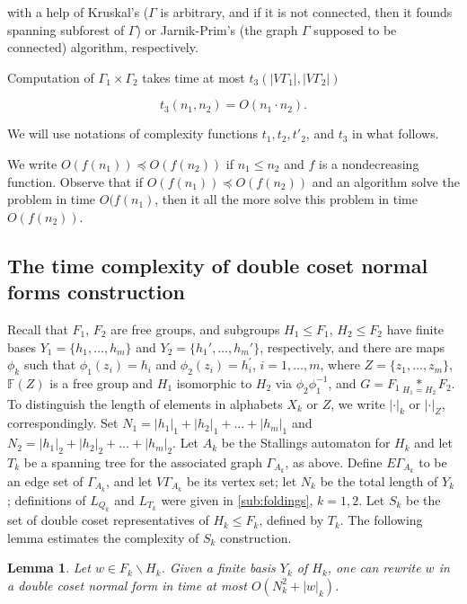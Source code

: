 \documentclass[a4paper,12pt]{article}
\newcommand{\G}{\Gamma }
\newtheorem{lemma}[theorem]{Lemma}
\numberwithin{equation}{section}
\numberwithin{figure}{section}
\newcommand{\FF}{\ensuremath{\mathbb{F}}}
\begin{document}
with a help of Kruskal's ($\G$ is arbitrary, and if it is not
connected, then it founds spanning subforest of $\G$) or
Jarnik-Prim's (the graph $\G$ supposed to be connected) algorithm,
respectively.

Computation of $\G_1 \times \G_2$ takes time at most $t_3(|V\G_1|,
|V\G_2|)$

\begin{equation}\label{t3}
t_3(n_1, n_2) = O(n_1 \cdot n_2).
\end{equation}

We will use notations of complexity functions $t_1, t_2, t'_2$,
and $t_3$ in what follows.

We write $O(f(n_1)) \preceq O(f(n_2))$ if $n_1\le n_2$ and $f$ is
a nondecreasing function. Observe that if $O(f(n_1)) \preceq
O(f(n_2))$ and an algorithm solve the problem in time $O(f(n_1)$,
then it all the more solve this problem in time $O(f(n_2))$.

\subsection{The time complexity of double coset normal forms construction}\label{sub:doubleCo_nf}

Recall that $F_1$, $F_2$ are free groups, and subgroups $H_1 \leq
F_1$, $H_2 \leq F_2$ have finite bases $Y_1 = \{h_1, \ldots, h_m
\}$ and $Y_2=\{h_1', \ldots, h_m'\}$, respectively, and there are
maps $\phi_k$ such that $\phi_1(z_i)=h_i$ and
$\phi_2(z_i)=h^\prime_i$, $i=1,\ldots ,m$, where $Z=\{z_1, \ldots,
z_m\}$, $\FF(Z)$ is a free group and $H_1$ isomorphic to $H_2$ via
$\phi_2 \phi_1^{-1}$, and ${G = F_1 \underset{H_1=H_2}{\ast}
F_2}$. To distinguish the length of elements in alphabets $X_k$ or
$Z$, we write $|\cdot|_k$ or $|\cdot|_Z$, correspondingly. Set
$N_1 = |h_1|_1 + |h_2|_1 + \ldots + |h_m|_1$ and $N_2 = |h_1|_2 +
|h_2|_2 + \ldots + |h_m|_2$. Let $A_k$ be the Stallings automaton
for $H_k$ and let $T_k$ be a spanning tree for the associated
graph $\G_{A_k}$, as above. Define $E\G_{A_k}$ to be an edge set
of $\G_{A_k}$, and let $V\G_{A_k}$ be its vertex set; let $N_k$ be
the total length of $Y_k$ ; definitions of $L_{Q_k}$ and $L_{T_k}$
were given in \ref{sub:foldings}, $k=1,2$. Let $S_k$ be the set of
double coset representatives of $H_k\le F_k$, defined by $T_k$.
The following lemma estimates the complexity of $S_k$
construction.

\begin{lemma}\label{lem:dctransversal} Let $w \in F_k \smallsetminus H_k$. Given a finite basis $Y_k$ of $H_k$, one can rewrite $w$ in a double coset normal
 form in time at most $O(N_k^2 + |w|_k)$.
\end{lemma}
\end{document}
